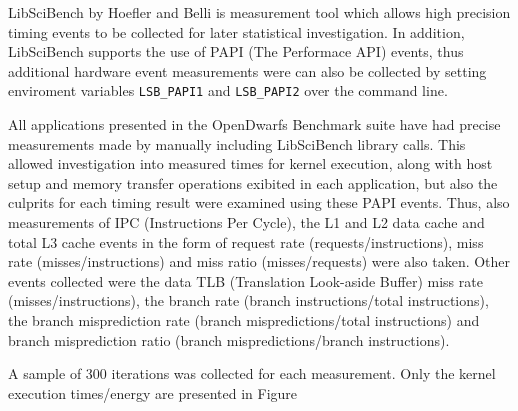 \documentclass[../document.tex]{subfiles}
\begin{document}
\label{ssec:measurements}

LibSciBench by Hoefler and Belli \cite{hoefler2015scientific} is measurement
tool which allows high precision timing events to be collected for later
statistical investigation. In addition, LibSciBench supports the use of
PAPI (The Performace API) \cite{mucci1999papi} events, thus additional
hardware event measurements were can also be collected by setting enviroment
variables {\tt LSB\_PAPI1} and {\tt LSB\_PAPI2} over the command line.

All applications presented in the OpenDwarfs Benchmark suite have had precise
measurements made by manually including LibSciBench library calls. This allowed
investigation into measured times for kernel execution, along with host setup
and memory transfer operations exibited in each application, but also the
culprits for each timing result were examined using these PAPI events. Thus,
also measurements of IPC (Instructions Per Cycle), the L1 and L2 data cache
and total L3 cache events in the form of request rate (requests/instructions),
miss rate (misses/instructions) and miss ratio (misses/requests) were also
taken. Other events collected were the data TLB (Translation Look-aside Buffer)
miss rate (misses/instructions), the branch rate (branch instructions/total
instructions), the branch misprediction rate (branch mispredictions/total
instructions) and branch misprediction ratio (branch mispredictions/branch
instructions).

A sample of 300 iterations was collected for each measurement.
Only the kernel execution times/energy are presented in Figure%
\end{document}
